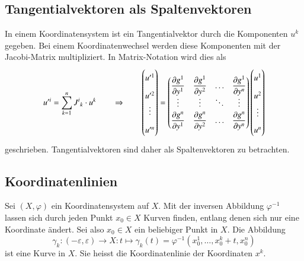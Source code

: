\subsection{Tangentialvektoren als Spaltenvektoren}
In einem Koordinatensystem ist ein Tangentialvektor durch die Komponenten
$u^k$ gegeben.
Bei einem Koordinatenwechsel werden diese Komponenten mit der
Jacobi-Matrix multipliziert.
In Matrix-Notation wird dies als
\[
u^{\prime i}
=
\sum_{k=1}^n
J^i\mathstrut_k \cdot u^k
\qquad\Rightarrow\qquad
\begin{pmatrix}
u^{\prime 1}\\
u^{\prime 2}\\[-2pt]
\vdots\\
u^{\prime n}
\end{pmatrix}
=
\bgroup
\renewcommand{\arraystretch}{1.8}
\begin{pmatrix}
\displaystyle\frac{\partial  g^1}{\partial y^1}&
\displaystyle\frac{\partial  g^1}{\partial y^2}&
\dots&
\displaystyle\frac{\partial  g^1}{\partial y^n}
\\[-2pt]
\vdots&\vdots&\ddots&\vdots\\[-2pt]
\displaystyle\frac{\partial  g^n}{\partial y^1}&
\displaystyle\frac{\partial  g^n}{\partial y^2}&
\dots&
\displaystyle\frac{\partial  g^n}{\partial y^n}
\end{pmatrix}
\egroup
\begin{pmatrix}
u^{1}\\
u^{2}\\
\vdots\\[-2pt]
u^{n}
\end{pmatrix}
\]
geschrieben.
Tangentialvektoren sind daher als Spaltenvektoren zu betrachten.
%

%
%
\subsection{Koordinatenlinien
\label{buch:koordinaten:tangentialvektoren:subsection:koordinatenlinien}}
Sei $(X,\varphi)$ ein Koordinatensystem auf $X$.
Mit der inversen Abbildung $\varphi^{-1}$ lassen sich durch jeden Punkt
$x_0\in X$ Kurven finden, entlang denen sich nur eine Koordinate
ändert.
Sei also $x_0\in X$ ein beliebiger Punkt in $X$.
Die Abbildung
\[
\gamma_k
\colon
(-\varepsilon,\varepsilon)
\to
X
:
t
\mapsto
\gamma_k(t)
=
\varphi^{-1}(x_0^1,\dots,x_0^k+t,x_0^n)
\]
ist eine Kurve in $X$.
Sie heisst die Koordinatenlinie der Koordinaten $x^k$.

